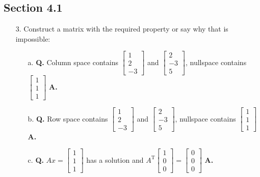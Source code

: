 \documentclass[main.tex]{subfiles}
\begin{document}
\subsection{Section 4.1}
\begin{enumerate}
    \item [3.] Construct a matrix with the required property or say why that is impossible:
    \begin{enumerate}
        \item [a.] \textbf{Q.} Column space contains $\left[\begin{array}{c}1 \\ 2 \\ -3\end{array}\right]$ and $\left[\begin{array}{c}2 \\ -3 \\ 5\end{array}\right]$, nullspace contains $\left[\begin{array}{l}1 \\ 1 \\ 1\end{array}\right]$ \textbf{A.}
        
        \item [b.] \textbf{Q.} Row space contains $\left[\begin{array}{c}1 \\ 2 \\ -3\end{array}\right]$ and $\left[\begin{array}{c}2 \\ -3 \\ 5\end{array}\right]$, nullspace contains $\left[\begin{array}{l}1 \\ 1 \\ 1\end{array}\right]$ \textbf{A.}
        
        \item [c.] \textbf{Q.} $A x=\left[\begin{array}{l}1 \\ 1 \\ 1\end{array}\right]$ has a solution and $A^{\mathrm{T}}\left[\begin{array}{l}1 \\ 0 \\ 0\end{array}\right]=\left[\begin{array}{l}0 \\ 0 \\ 0\end{array}\right]$ \textbf{A.}
        

\end{enumerate}
\end{enumerate}
\end{document}
